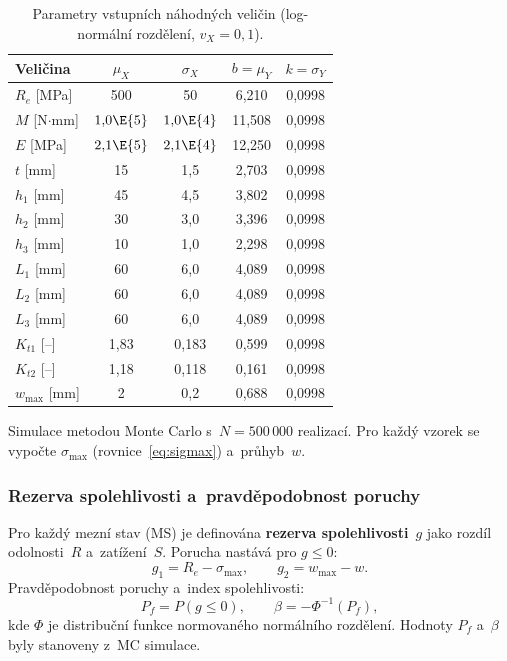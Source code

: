 \begin{table}[H]
\centering
\caption{Parametry vstupních náhodných veličin (log-normální rozdělení, $v_X = 0{,}1$).}
\begin{tabular}{lcccc}
\toprule
\textbf{Veličina} & $\mu_X$ & $\sigma_X$ & $b = \mu_Y$ & $k = \sigma_Y$ \\
\midrule
$R_e$ [MPa]    & 500       & 50      & 6{,}210  & 0{,}0998 \\
$M$ [N$\cdot$mm] & $1{,}0\E{5}$ & $1{,}0\E{4}$ & 11{,}508 & 0{,}0998 \\
$E$ [MPa]      & $2{,}1\E{5}$ & $2{,}1\E{4}$ & 12{,}250 & 0{,}0998 \\
$t$ [mm]       & 15        & 1{,}5   & 2{,}703  & 0{,}0998 \\
$h_1$ [mm]     & 45        & 4{,}5   & 3{,}802  & 0{,}0998 \\
$h_2$ [mm]     & 30        & 3{,}0   & 3{,}396  & 0{,}0998 \\
$h_3$ [mm]     & 10        & 1{,}0   & 2{,}298  & 0{,}0998 \\
$L_1$ [mm]     & 60        & 6{,}0   & 4{,}089  & 0{,}0998 \\
$L_2$ [mm]     & 60        & 6{,}0   & 4{,}089  & 0{,}0998 \\
$L_3$ [mm]     & 60        & 6{,}0   & 4{,}089  & 0{,}0998 \\
$K_{t1}$ [--]  & 1{,}83    & 0{,}183 & 0{,}599  & 0{,}0998 \\
$K_{t2}$ [--]  & 1{,}18    & 0{,}118 & 0{,}161  & 0{,}0998 \\
$w_{\max}$ [mm] & 2        & 0{,}2   & 0{,}688  & 0{,}0998 \\
\bottomrule
\end{tabular}
\end{table}

Simulace metodou Monte Carlo s~$N = 500\,000$ realizací. Pro každý vzorek se vypočte $\sigma_{\max}$ (rovnice~\eqref{eq:sigmax}) a~průhyb~$w$.

\subsubsection{Rezerva spolehlivosti a~pravděpodobnost poruchy}

Pro každý mezní stav (MS) je definována \textbf{rezerva spolehlivosti}~$g$ jako rozdíl odolnosti~$R$ a~zatížení~$S$. Porucha nastává pro $g \le 0$:
\begin{equation}
    g_1 = R_e - \sigma_{\max}, \qquad g_2 = w_{\max} - w.
\end{equation}
Pravděpodobnost poruchy a~index spolehlivosti:
\begin{equation}
    P_f = P(g \le 0), \qquad \beta = -\Phi^{-1}(P_f),
\end{equation}
kde $\Phi$ je distribuční funkce normovaného normálního rozdělení. Hodnoty $P_f$ a~$\beta$ byly stanoveny z~MC simulace.

